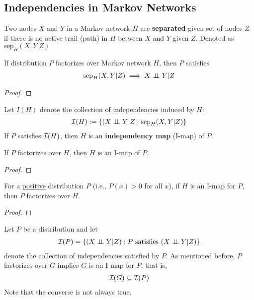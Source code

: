 \documentclass[11pt]{article}
\newcommand{\sep}[0]{\text{sep}}
\begin{document}
	\subsection{Independencies in Markov Networks}
	\begin{definition}
		Two nodes $X$ and $Y$ in a Markov network $H$ are \textbf{separated} given set of nodes $Z$ if there is no active trail (path) in $H$ between $X$ and $Y$ given $Z$. Denoted as $\sep_H(X, Y|Z)$
	\end{definition}
	
	\begin{theorem}
		If distribution $P$ factorizes over Markov network $H$, then $P$ satisfies
		\begin{align}
			\sep_H(X, Y|Z) \implies X \indep Y | Z
		\end{align} 
	\end{theorem}
	
	\begin{proof}
		
	\end{proof}
	
	\begin{definition}
		Let $I(H)$ denote the collection of independencies induced by $H$:
		\begin{align}
			\mc{I}(H) := \{(X \indep Y | Z: \sep_H(X, Y | Z)\}
		\end{align}
		If $P$ satisfies $\mathcal{{I}}(H)$, then $H$ is an \textbf{independency map} (I-map) of $P$.
	\end{definition}
	
	\begin{theorem}
		If $P$ factorizes over $H$, then $H$ is an I-map of $P$.
	\end{theorem}
	
	\begin{proof}
		
	\end{proof}
	
	\begin{theorem}
		For a \ul{positive} distribution $P$ (i.e., $P(x) >0$ for all $x$), if $H$ is an I-map for $P$, then $P$ factorizes over $H$.
	\end{theorem}
	
	\begin{proof}
		
	\end{proof}
	
	\begin{remark}
		Let $P$ be a distribution and let
		\begin{align}
			\mathcal{{I}}(P) = \{(X \perp \!\!\! \perp Y|Z): P \text{{ satisfies }}(X \perp \!\!\! \perp Y|Z)\}
		\end{align}
		denote the collection of independencies satisfied by $P$. As mentioned before, $P$ factorizes over $G$ implies $G$ is an I-map for $P$, that is,
		\begin{align}
			\mathcal{{I}}(G) \subseteq \mathcal{{I}}(P)
		\end{align}
		Note that the converse is not always true.
	\end{remark}
\end{document}
